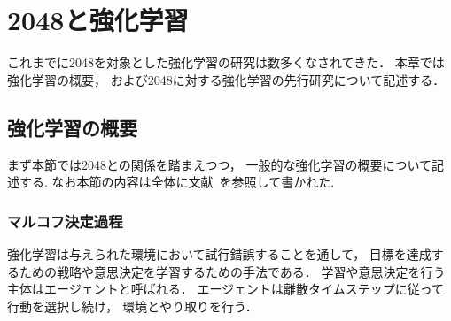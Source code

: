 \chapter{2048と強化学習}
\label{chap:rl}
これまでに2048を対象とした強化学習の研究は数多くなされてきた． 
本章では強化学習の概要， および2048に対する強化学習の先行研究について記述する．

\section{強化学習の概要}
\label{sec:rl_general}
まず本節では2048との関係を踏まえつつ， 一般的な強化学習の概要について記述する.
なお本節の内容は全体に文献~\cite{Sutton1998}を参照して書かれた.

\subsection{マルコフ決定過程}
\label{subsec:mdp}
強化学習は与えられた環境において試行錯誤することを通して， 目標を達成するための戦略や意思決定を学習するための手法である．
学習や意思決定を行う主体はエージェントと呼ばれる．
エージェントは離散タイムステップに従って行動を選択し続け， 環境とやり取りを行う．


